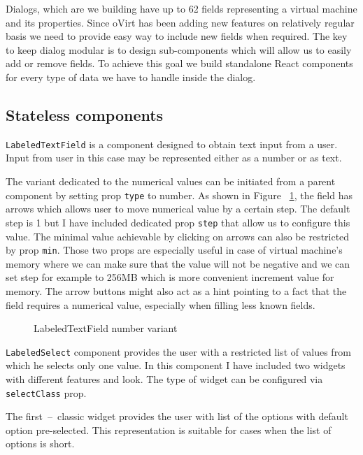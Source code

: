 Dialogs, which are we building have up to 62 fields representing a virtual machine and its properties. Since oVirt has been adding new features on relatively regular basis we need to provide easy way to include new fields when required. The key to keep dialog modular is to design sub-components which will allow us to easily add or remove fields. To achieve this goal we build standalone React components for every type of data we have to handle inside the dialog.

\subsection{Stateless components}
\texttt{LabeledTextField} is a component designed to obtain text input from a user. Input from user in this case may be represented either as a number or as text.

The variant dedicated to the numerical values can be initiated from a parent component by setting prop \texttt{type} to number. As shown in Figure~ \ref{labelledTextField}, the field has arrows which allows user to move numerical value by a certain step. The default step is 1 but I have included dedicated prop \texttt{step} that allow us to configure this value. The minimal value achievable by clicking on arrows can also be restricted by prop \texttt{min}. Those two props are especially useful in case of virtual machine's memory where we can make sure that the value will not be negative and we can set step for example to 256MB which is more convenient increment value for memory. 
The arrow buttons might also act as a hint pointing to a fact that the field requires a numerical value, especially when filling less known fields.

\begin{figure}[h]
\caption{LabeledTextField number variant}
\label{labelledTextField}
\end{figure} 

\texttt{LabeledSelect} component provides the user with a restricted list of values from which he selects only one value. In this component I have included two widgets with different features and look. The type of widget can be configured via \texttt{selectClass} prop. 

The first~--~classic widget provides the user with list of the options with default option pre-selected. This representation is suitable for cases when the list of options is short.

